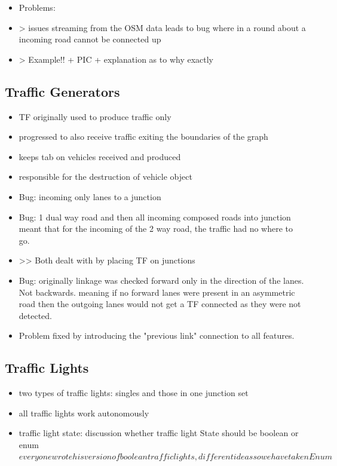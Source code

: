 \begin{itemize}
	\item Problems:
	\item > issues streaming from the OSM data leads to bug where in a round about a incoming road cannot be connected up
	\item > Example!! + PIC + explanation as to why exactly
\end{itemize}

\subsection{Traffic Generators}
\begin{itemize}
	\item TF originally used to produce traffic only
	\item progressed to also receive traffic exiting the boundaries of the graph
	\item keeps tab on vehicles received and produced
	\item responsible for the destruction of vehicle object
	\item Bug: incoming only lanes to a junction
	\item Bug: 1 dual way road and then all incoming composed roads into junction meant that for the incoming of the 2 way road, the traffic had no where to go.
	\item >> Both dealt with by placing TF on junctions
	\item Bug: originally linkage was checked forward only in the direction of the lanes. Not backwards. meaning if no forward lanes were present in an asymmetric road then the outgoing lanes would not get a TF connected as they were not detected.
	\item Problem fixed by introducing the "previous link" connection to all features.
\end{itemize}


\subsection{Traffic Lights}
\begin{itemize}
    \item two types of traffic lights: singles and those in one junction set
    \item all traffic lights work autonomously
	\item traffic light state: discussion whether traffic light State should be boolean or enum \(everyone wrote his version of boolean traffic lights, different ideas so we have taken Enum\)
\end{itemize}

